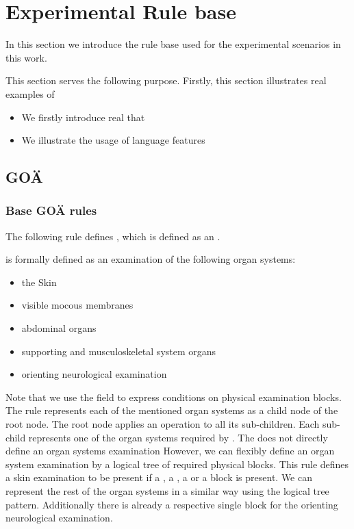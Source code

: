 \section{Experimental Rule base}
In this section we introduce the rule base used for the experimental scenarios in this work.

This section serves the following purpose.
Firstly, this section illustrates real examples of

\begin{itemize}
    \item We firstly introduce real that
    \item We illustrate the usage of language features
\end{itemize}

\subsection{GOÄ}
\subsubsection{Base GOÄ rules}

The following rule defines , which is defined as an .






 is formally defined as an examination of the following organ systems:
\begin{itemize}
    \item the Skin
    \item visible mocous membranes
    \item abdominal organs
    \item supporting and musculoskeletal system organs
    \item orienting neurological examination
\end{itemize}

Note that we use the  field to express conditions on physical examination blocks.
The rule represents each of the mentioned organ systems as a child node of the root node.
The root node applies an  operation to all its sub-children.
Each sub-child represents one of the organ systems required by .
The \AVS does not directly define an organ systems examination
However, we can flexibly define an organ system examination by a logical tree of required physical blocks.
This rule defines a skin examination to be present if a , a , a  or a  block is present.
We can represent the rest of the organ systems in a similar way using the logical tree pattern.
Additionally there is already a respective single block for the orienting neurological examination.

